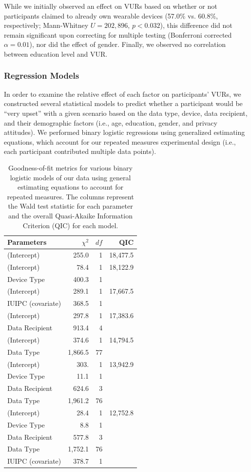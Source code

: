 \documentclass{acm_proc_article-sp}
\begin{document}
While we initially observed an effect on VURs based on whether or not participants claimed to already own wearable devices (57.0\% vs. 60.8\%, respectively; Mann-Whitney $U=202,896$, $p<0.032$), this difference did not remain significant upon correcting for multiple testing (Bonferroni corrected $\alpha=0.01$), nor did the effect of gender. Finally, we observed no correlation between education level and VUR.

\subsubsection{Regression Models} 
\label{sec:regression}
In order to examine the relative effect of each factor on participants' VURs, we constructed several statistical models to predict whether a participant would be ``very upset'' with a given scenario based on the data type, device, data recipient, and their demographic factors (i.e., age, education, gender, and privacy attitudes). We performed binary logistic regressions using generalized estimating equations, which account for our repeated measures experimental design (i.e., each participant contributed multiple data points).

\begin{table}
\centering
\begin{tabular}{|l| r| r| r|}
\hline
Parameters & $\chi^2$ & $df$ & QIC\\
\hline
\hline
(Intercept) & 255.0 & 1 & 18,477.5\\
\hline
(Intercept) & 78.4 & 1 & 18,122.9\\
Device Type & 400.3 & 1 & \\
\hline
(Intercept) & 289.1 & 1 & 17,667.5\\
IUIPC (covariate) & 368.5 & 1 & \\
\hline
(Intercept) & 297.8 & 1 &17,383.6\\
Data Recipient & 913.4 & 4 & \\
\hline
(Intercept) & 374.6 & 1 & 14,794.5\\
Data Type & 1,866.5 & 77 & \\
\hline
(Intercept) & 303. & 1 & 13,942.9\\
Device Type & 11.1 & 1 &  \\
Data Recipient & 624.6 & 3 & \\
Data Type & 1,961.2 & 76 &  \\
\hline
(Intercept) & 28.4 & 1 & 12,752.8 \\
Device Type & 8.8 & 1 &  \\
Data Recipient & 577.8 & 3 & \\
Data Type & 1,752.1 & 76 & \\
IUIPC (covariate) & 378.7 & 1 & \\
\hline
\end{tabular}
\caption{Goodness-of-fit metrics for various binary logistic models of our data using general estimating equations to account for repeated measures. The columns represent the Wald test statistic for each parameter and the overall Quasi-Akaike Information Criterion (QIC) for each model.}
\label{regression}
\end{table}
\end{document}
